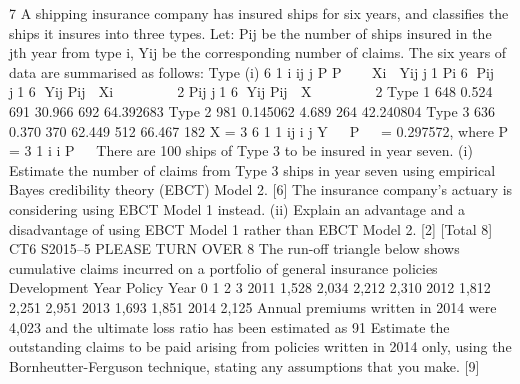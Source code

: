 7 A shipping insurance company has insured ships for six years, and classifies the
ships it insures into three types.
Let:
  Pij be the number of ships insured in the jth year from type i,
Yij be the corresponding number of claims.
The six years of data are summarised as follows:
  Type (i)
6
1
i ij
j
P P

  Xi 
Yij
j1 Pi
6
Pij
j1
6
Yij
Pij
 Xi






2
Pij
j1
6
Yij
Pij
 X






2
Type 1 648 0.524 691 30.966 692 64.392683
Type 2 981 0.145062 4.689 264 42.240804
Type 3 636 0.370 370 62.449 512 66.467 182
X =
  3 6
1 1
ij
i j
Y
  P
  = 0.297572, where P =
  3
1
i
i
P
 
There are 100 ships of Type 3 to be insured in year seven.
(i) Estimate the number of claims from Type 3 ships in year seven using
empirical Bayes credibility theory (EBCT) Model 2. [6]
The insurance company’s actuary is considering using EBCT Model 1 instead.
(ii) Explain an advantage and a disadvantage of using EBCT Model 1 rather
than EBCT Model 2. [2]
[Total 8]
CT6 S2015–5 PLEASE TURN OVER
8 The run-off triangle below shows cumulative claims incurred on a portfolio of
general insurance policies
Development Year
Policy Year 0 1 2 3
2011 1,528 2,034 2,212 2,310
2012 1,812 2,251 2,951
2013 1,693 1,851
2014 2,125
Annual premiums written in 2014 were 4,023 and the ultimate loss ratio has been
estimated as 91%
Estimate the outstanding claims to be paid arising from policies written in 2014
only, using the Bornheutter-Ferguson technique, stating any assumptions that you
make. [9]


